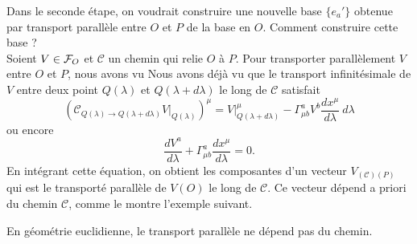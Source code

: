 \documentclass[a4paper,11pt]{report}
\begin{document}
                Dans le seconde étape, on voudrait construire une nouvelle base $\{e_a'\}$ obtenue par transport parallèle entre $O$ et $P$ de la base en $O$. Comment construire cette base ?\\
                Soient $V\in\mathcal{F}_O$ et $\mathscr{C}$ un chemin qui relie $O$ à $P$. Pour transporter parallèlement $V$ entre $O$ et $P$, nous avons vu Nous avons déjà vu que le transport infinitésimale de $V$ entre deux point $Q(\lambda)$ et $Q(\lambda+d\lambda)$ le long de $\mathscr{C}$ satisfait
                \begin{equation}
                    \left(\mathscr{C}_{Q(\lambda)\to Q(\lambda+d\lambda)}V|_{Q(\lambda)}\right)^\mu = V|_{Q(\lambda+d\lambda)}^\mu-\Gamma^a_{\mu b}V^b \frac{dx^\mu}{d\lambda} ~d\lambda
                \end{equation}
                ou encore 
                \begin{equation}\label{eq:transportv}
                    \frac{dV^a}{d\lambda} + \Gamma^a_{\mu b}\frac{dx^\mu}{d\lambda} = 0.
                \end{equation}
                En intégrant cette équation, on obtient les composantes d'un vecteur $V_{(\mathscr{C})(P)}$ qui est le transporté parallèle de $V(O)$ le long de $\mathscr{C}$. Ce vecteur dépend a priori du chemin $\mathscr{C}$, comme le montre l'exemple suivant.
                
                \begin{exmp}
                    En géométrie euclidienne, le transport parallèle ne dépend pas du chemin.
                \end{exmp}
                
\end{document}
